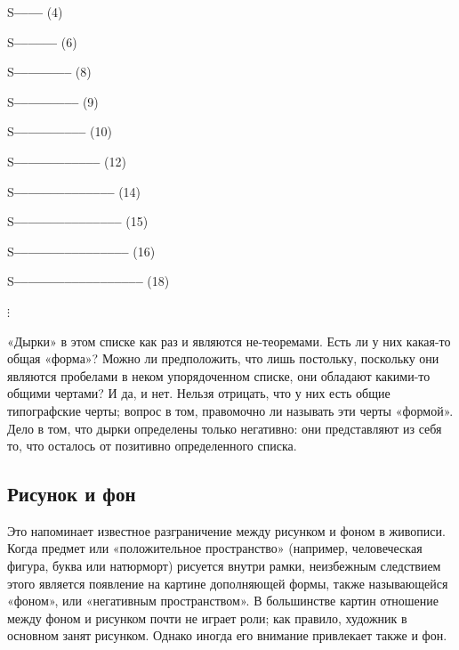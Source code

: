 \documentclass[../main.tex]{subfiles}
\begin{document}
\begin{center}
\begin{minipage}{0.4\textwidth}
    S\textbf{--{}--{}--{}--} (4)

    S\textbf{--{}--{}--{}--{}--{}--} (6)

    S\textbf{--{}--{}--{}--{}--{}--{}--{}--} (8)

    S\textbf{--{}--{}--{}--{}--{}--{}--{}--{}--} (9)

    S\textbf{--{}--{}--{}--{}--{}--{}--{}--{}--{}--} (10)

    S\textbf{--{}--{}--{}--{}--{}--{}--{}--{}--{}--{}--{}--} (12)

    S\textbf{--{}--{}--{}--{}--{}--{}--{}--{}--{}--{}--{}--{}--{}--} (14)

    S\textbf{--{}--{}--{}--{}--{}--{}--{}--{}--{}--{}--{}--{}--{}--{}--} (15)

    S\textbf{--{}--{}--{}--{}--{}--{}--{}--{}--{}--{}--{}--{}--{}--{}--{}--} (16)

    S\textbf{--{}--{}--{}--{}--{}--{}--{}--{}--{}--{}--{}--{}--{}--{}--{}--{}--{}--} (18)
\end{minipage}

$\vdots$
\end{center}

«Дырки» в этом списке как раз и являются не-теоремами. Есть ли у них какая-то общая «форма»? Можно ли предположить, что лишь постольку, поскольку они являются пробелами в неком упорядоченном списке, они обладают какими-то общими чертами? И да, и нет. Нельзя отрицать, что у них есть общие типографские черты; вопрос в том, правомочно ли называть эти черты «формой». Дело в том, что дырки определены только негативно: они представляют из себя то, что осталось от позитивно определенного списка.


\subsection{Рисунок и фон}

Это напоминает известное разграничение между рисунком и фоном в живописи.
Когда предмет или «положительное пространство» (например, человеческая фигура, буква или натюрморт) рисуется внутри рамки, неизбежным следствием этого является появление на картине дополняющей формы, также называющейся «фоном», или «негативным пространством».
В большинстве картин отношение между фоном и рисунком почти не играет роли; как правило, художник в основном занят рисунком.
Однако иногда его внимание привлекает также и фон.
\end{document}
